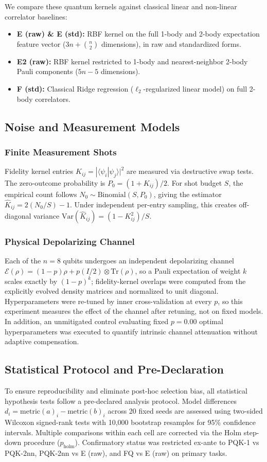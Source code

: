 \documentclass[conference]{IEEEtran}
\begin{document}
We compare these quantum kernels against classical linear and non-linear correlator baselines:
\begin{itemize}
    \item \textbf{E (raw) \& E (std):} RBF kernel on the full 1-body and 2-body expectation feature vector ($3n + \binom{n}{2}$ dimensions), in raw and standardized forms.
    \item \textbf{E2 (raw):} RBF kernel restricted to 1-body and nearest-neighbor 2-body Pauli components ($5n-5$ dimensions).
    \item \textbf{F (std):} Classical Ridge regression ($\ell_2$-regularized linear model) on full 2-body correlators.
\end{itemize}

\subsection{Noise and Measurement Models}
\subsubsection{Finite Measurement Shots}
Fidelity kernel entries $K_{ij} = |\langle \psi_i | \psi_j \rangle|^2$ are measured via destructive swap tests. The zero-outcome probability is $P_0 = (1 + K_{ij})/2$. For shot budget $S$, the empirical count follows $N_0 \sim \text{Binomial}(S, P_0)$, giving the estimator $\hat{K}_{ij} = 2(N_0/S) - 1$. Under independent per-entry sampling, this creates off-diagonal variance $\text{Var}(\hat{K}_{ij}) = (1 - K_{ij}^2)/S$.

\subsubsection{Physical Depolarizing Channel}
Each of the $n = 8$ qubits undergoes an independent depolarizing channel $\mathcal{E}(\rho) = (1-p)\rho + p(I/2) \otimes \text{Tr}(\rho)$, so a Pauli expectation of weight $k$ scales exactly by $(1-p)^k$; fidelity-kernel overlaps were computed from the explicitly evolved density matrices and normalized to unit diagonal. Hyperparameters were re-tuned by inner cross-validation at every $p$, so this experiment measures the effect of the channel after retuning, not on fixed models. In addition, an unmitigated control evaluating fixed $p=0.00$ optimal hyperparameters was executed to quantify intrinsic channel attenuation without adaptive compensation.

\subsection{Statistical Protocol and Pre-Declaration}
To ensure reproducibility and eliminate post-hoc selection bias, all statistical hypothesis tests follow a pre-declared analysis protocol. Model differences $d_i = \text{metric}(a)_i - \text{metric}(b)_i$ across 20 fixed seeds are assessed using two-sided Wilcoxon signed-rank tests with 10,000 bootstrap resamples for 95\% confidence intervals. Multiple comparisons within each cell are corrected via the Holm step-down procedure ($p_{\text{holm}}$). Confirmatory status was restricted ex-ante to PQK-1 vs PQK-2nn, PQK-2nn vs E (raw), and FQ vs E (raw) on primary tasks.
\end{document}
